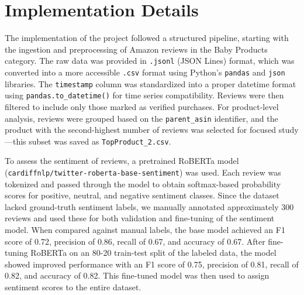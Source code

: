 \documentclass[letterpaper]{article}
\begin{document}
\section{Implementation Details}
The implementation of the project followed a structured pipeline, starting with the ingestion and preprocessing of Amazon reviews in the Baby Products category. The raw data was provided in \texttt{.jsonl} (JSON Lines) format, which was converted into a more accessible \texttt{.csv} format using Python’s \texttt{pandas} and \texttt{json} libraries. The \texttt{timestamp} column was standardized into a proper datetime format using \texttt{pandas.to\_datetime()} for time series compatibility. Reviews were then filtered to include only those marked as verified purchases. For product-level analysis, reviews were grouped based on the \texttt{parent\_asin} identifier, and the product with the second-highest number of reviews was selected for focused study—this subset was saved as \texttt{TopProduct\_2.csv}.

To assess the sentiment of reviews, a pretrained RoBERTa model (\texttt{cardiffnlp/twitter-roberta-base-sentiment}) was used. Each review was tokenized and passed through the model to obtain softmax-based probability scores for positive, neutral, and negative sentiment classes. Since the dataset lacked ground-truth sentiment labels, we manually annotated approximately 300 reviews and used these for both validation and fine-tuning of the sentiment model. When compared against manual labels, the base model achieved an F1 score of 0.72, precision of 0.86, recall of 0.67, and accuracy of 0.67. After fine-tuning RoBERTa on an 80-20 train-test split of the labeled data, the model showed improved performance with an F1 score of 0.75, precision of 0.81, recall of 0.82, and accuracy of 0.82. This fine-tuned model was then used to assign sentiment scores to the entire dataset.
\end{document}
